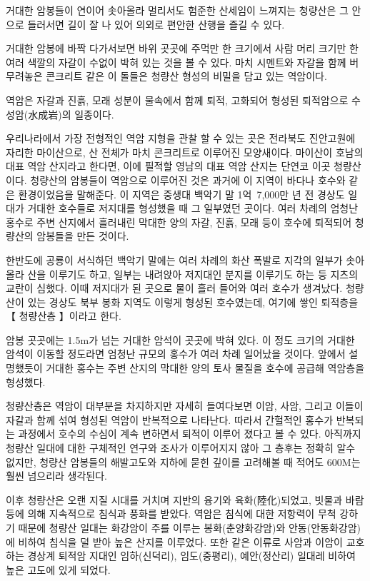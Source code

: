 \documentclass[12pt, a4paper, twoside]{book}
\begin{document}
				거대한 암봉들이 연이어 솟아올라 멀리서도 험준한 산세임이 느껴지는 청량산은 그 안으로 들러서면 길이 잘 나 있어 의외로 편안한 산행을 즐길 수 있다.
				
				거대한 암봉에 바짝 다가서보면 바위 곳곳에 주먹만 한 크기에서 사람 머리 크기만 한 여러 색깔의 자갈이 수없이 박혀 있는 것을 볼 수 있다. 
				마치 시멘트와 자갈을 함께 버무려놓은 콘크리트 같은 이 돌들은 청량산 형성의 비밀을 담고 있는 역암이다.
				
				역암은 자갈과 진흙, 모래 성분이 물속에서 함께 퇴적, 고화되어 형성된 퇴적암으로 수성암(水成岩)의 일종이다. 
				
				우리나라에서 가장 전형적인 역암 지형을 관찰 할 수 있는 곳은 전라북도 진안고원에 자리한 마이산으로, 산 전체가 마치 콘크리트로 이루어진 모양새이다. 
				마이산이 호남의 대표 역암 산지라고 한다면, 이에 필적할 영남의 대표 역암 산지는 단연코 이곳 청량산이다. 
				청량산의 암봉들이 역암으로 이루어진 것은 과거에 이 지역이 바다나 호수와 같은 환경이었음을 말해준다. 
				이 지역은 중생대 백악기 말 1억~7,000만 년 전 경상도 일대가 거대한 호수들로 저지대를 형성했을 때 그 일부였던 곳이다. 
				여러 차례의 엄청난 홍수로 주변 산지에서 흘러내린 막대한 양의 자갈, 진흙, 모래 등이 호수에 퇴적되어 청량산의 암봉들을 만든 것이다.
				
				
				한반도에 공룡이 서식하던 백악기 말에는 여러 차례의 화산 폭발로 지각의 일부가 솟아올라 산을 이루기도 하고, 일부는 내려앉아 저지대인 분지를 이루기도 하는 등 지츠의 교란이 심했다. 
				이때 저지대가 된 곳으로 물이 흘러 들어와 여러 호수가 생겨났다. 
				청량산이 있는 경상도 북부 봉화 지역도 이렇게 형성된 호수였는데, 여기에 쌓인 퇴적층을 【 청량산층 】이라고 한다.
				
				암봉 곳곳에는 1.5m가 넘는 거대한 암석이 곳곳에 박혀 있다. 
				이 정도 크기의 거대한 암석이 이동할 정도라면 엄청난 규모의 홍수가 여러 차례 일어났을 것이다. 
				앞에서 설명했듯이 거대한 홍수는 주변 산지의 막대한 양의 토사 물질을 호수에 공급해 역암층을 형성했다.
				
				청량산층은 역암이 대부분을 차지하지만 자세히 들여다보면 이암, 사암, 그리고 이들이 자갈과 함께 섞여 형성된 역암이 반복적으로 나타난다. 
				따라서 간헐적인 홍수가 반복되는 과정에서 호수의 수심이 계속 변하면서 퇴적이 이루어 졌다고 볼 수 있다. 
				아직까지 청량산 일대에 대한 구체적인 연구와 조사가 이루어지지 않아 그 층후는 정확히 알수 없지만, 청량산 암봉들의 해발고도와 지하에 묻힌 깊이를 고려해볼 때 적어도 600M는 훨씬 넘으리라 생각된다.
				
				
				이후 청량산은 오랜 지질 시대를 거치며 지반의 융기와 육화(陸化)되었고, 빗물과 바람 등에 의해 지속적으로 침식과 풍화를 받았다. 
				역암은 침식에 대한 저항력이 무척 강하기 때문에 청량산 일대는 화강암이 주를 이루는 봉화(춘양화강암)와 안동(안동화강암)에 비하여 침식을 덜 받아 높은 산지를 이루었다. 
				또한 같은 이류로 사암과 이암이 교호하는 경상계 퇴적암 지대인 임하(신덕리), 임도(중평리), 예안(정산리) 일대레 비하여 높은 고도에 있게 되었다.
				
\end{document}
